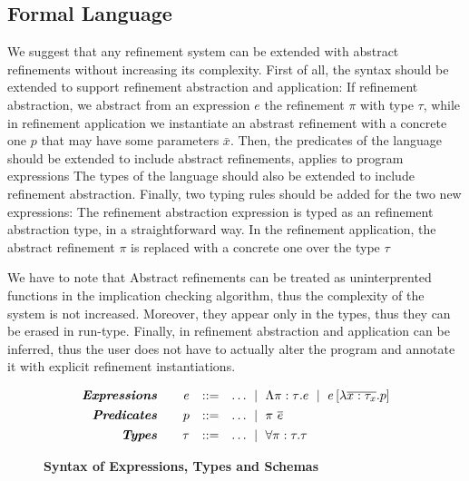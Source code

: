 \subsection{Formal Language}
We suggest that any refinement system can be extended with abstract refinements
without increasing its complexity.
%
First of all, the syntax should be extended to support refinement abstraction
and application:		
If refinement abstraction, we abstract from an expression $e$
the refinement $\pi$ with type $\tau$, while in refinement application
we instantiate an abstrast refinement with a concrete one $p$
that may have some parameters $\bar{x}$.
%
Then, the predicates of the language should be extended to 
include abstract refinements, applies to program expressions
%
The types of the language should also be extended to include 
refinement abstraction.
%
Finally, two typing rules should be added for the two new expressions:
The refinement abstraction expression is typed as an refinement abstraction
type, in a straightforward way.
In the refinement application, the abstract refinement $\pi$ is replaced with a concrete one
over the type $\tau$

We have to note that
Abstract refinements 
can be treated as uninterprented functions in the implication
checking algorithm, thus the complexity of the system is not increased.
Moreover, they appear only in the types, thus they can be erased in run-type.
Finally, in \cite{Vazou13} refinement abstraction and application can be inferred, 
thus the user does not have to actually alter the program
and annotate it with explicit refinement instantiations.
\begin{figure}[ht!]
\centering
$$
\begin{array}{rrcl}
\emphbf{Expressions} \quad 
  & e 
  & ::= 
  & 		 \dots
  \spmid \epabs{\rvar}{\tau}{e}
  \spmid \epapp{e}{\efunbar{x:\tau_x}{p}} 
  \\[0.05in] 

\emphbf{Predicates} \quad 
  & p
  & ::= 
  &		\dots
  \spmid \rvapp{\rvar}{e}  
  \\[0.05in] 
\emphbf{Types} \quad 
  & \tau 
  & ::= 
  &		 \dots
  \spmid \tpabs{\rvar}{\tau}{\tau}

\end{array}
$$
\caption{\textbf{Syntax of Expressions, Types and Schemas}}
\label{fig:syntax}
\end{figure}


